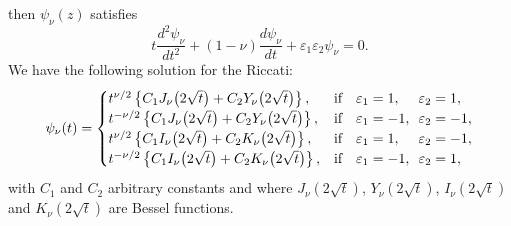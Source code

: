 \documentclass[12pt]{article}
\numberwithin{figure}{section}
\numberwithin{equation}{section}
\numberwithin{table}{section}
\begin{document}
then $\psi_\nu(z)$ satisfies
\begin{equation}
t\frac{d^2\psi_\nu}{dt^2}+(1-\nu)\frac{d\psi_\nu}{dt}+\varepsilon_1\varepsilon_2\psi_\nu=0.
\end{equation}
We have the following solution for the Riccati:
$$
\psi_{\nu}(t)=\begin{cases}
t^{\nu/2}\left\{C_1J_{\nu}\big(2\sqrt t\big)+C_2Y_{\nu}\big(2\sqrt t\big)\right\},&\mbox{\rm if}\quad \varepsilon_1=1,\phantom{-}\enskip\varepsilon_2=1,\\
t^{-\nu/2}\left\{C_1J_{\nu}\big(2\sqrt t\big)+C_2Y_{\nu}\big(2\sqrt t\big)\right\},&\mbox{\rm if}\quad \varepsilon_1=-1,\enskip\varepsilon_2=-1,\\
t^{\nu/2}\left\{C_1I_{\nu}\big(2\sqrt t\big)+C_2K_{\nu}\big(2\sqrt t\big)\right\},&\mbox{\rm if}\quad\varepsilon_1=1,\phantom{-}\enskip\varepsilon_2=-1,\\
t^{-\nu/2}\left\{C_1I_{\nu}\big(2\sqrt t\big)+C_2K_{\nu}\big(2\sqrt t\big)\right\},&\mbox{\rm if}\quad\varepsilon_1=-1,\enskip\varepsilon_2=1,
\end{cases}
$$
with $C_1$ and $C_2$ arbitrary constants and where $J_{\nu}(2\sqrt t)$, $Y_{\nu}(2\sqrt t)$, $I_{\nu}(2\sqrt t)$ and $K_{\nu}(2\sqrt t)$ are {Bessel functions}.
\end{document}
